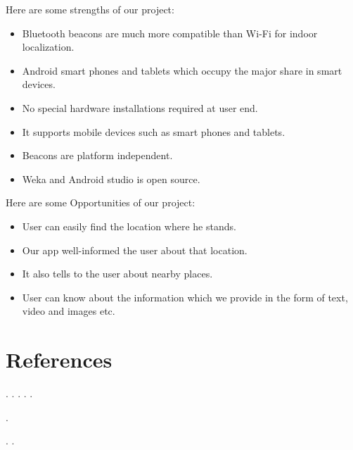 \documentclass{article}
\begin{document}
Here are some strengths of our project:
\begin{itemize}
\item Bluetooth beacons are much more compatible than Wi-Fi for indoor localization.
\item Android smart phones and tablets which occupy the major share in smart devices.
\item No special hardware installations required at user end.
\item It supports mobile devices such as  smart phones and tablets. 
\item Beacons are platform independent. 
\item Weka and Android studio is open source.
\end{itemize}
Here are some Opportunities of our project:
\begin{itemize}
\item User can easily find the location where he stands.
\item Our app well-informed the user about that location.
\item It also tells to the user about nearby places.
\item User can know about the information which we provide in the form of text, video and images etc.
\end{itemize}
\pagebreak



\section{References}
\cite{akram2018censloc}.
\cite{cooper2016loco}.
\cite{hultgren2015evaluating}.
\cite{zhuang2016smartphone}.
\cite{Introduction}.

\cite{Localization}.

\cite{belmonte2017indoor}.
\cite{wei2018end}.
\end{document}
